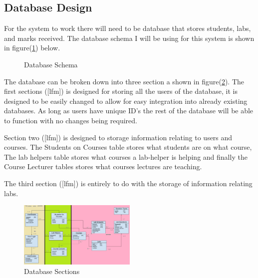 \documentclass[12pt]{article}  %
\begin{document}
\newpage
\subsection{Database Design}
\label{sec:design-db}
For the system to work there will need to be database that stores students, labs, and marks received. The database schema I will be using for this system is shown in figure(\ref{fig:dbschema}) below.

\begin{figure}[H]
	\caption{Database Schema}
	\label{fig:dbschema}
\end{figure}

\noindent The database can be broken down into three section a shown in figure(\ref{fig:dbsections}). The first sections ([lfm]) is designed for storing all the users of the database, it is designed to be easily changed to allow for easy integration into already existing databases. As long as users have unique ID's the rest of the database will be able to function with no changes being required.

Section two ([lfm]) is designed to storage information relating to users and courses. The Students on Courses table stores what students are on what course, The lab helpers table stores what courses a lab-helper is helping and finally the Course Lecturer tables stores what courses lectures are teaching.

The third section ([lfm]) is entirely to do with the storage of information relating labs.

\begin{figure}[H]
    \centering
    \includegraphics[width=0.5\textwidth]{images/design/DB_Sections.png}
    \caption{Database Sections}
    \label{fig:dbsections}
\end{figure}
\end{document}
